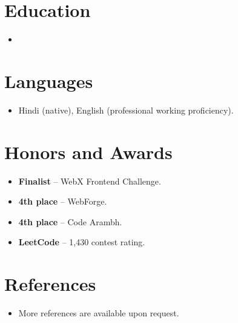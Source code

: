 \documentclass[11pt,a4paper,sans]{moderncv}
\begin{document}

\section{Education}
\vspace{1pt}
\begin{itemize}

\item{}

\end{itemize}


\section{Languages}
\vspace{1pt}
\begin{itemize}
\item {Hindi (native), English (professional working proficiency).}
\end{itemize}


\section{Honors and Awards}
\vspace{1pt}
\begin{itemize}
\item{\textbf{Finalist} -- WebX Frontend Challenge.}
\item{\textbf{4th place} -- WebForge.}
\item{\textbf{4th place} -- Code Arambh.}
\item{\textbf{LeetCode} -- 1,430 contest rating.}
\end{itemize}


\section{References}
\vspace{1pt}
\begin{itemize}
\item{More references are available upon request.}
\end{itemize}
\end{document}
